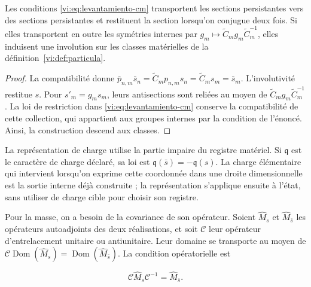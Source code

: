 \begin{proposition}
\label{vi:prop:antiseccion-persistente}
Les conditions \eqref{vi:eq:levantamiento-cm} transportent les sections
persistantes vers des sections persistantes et restituent la section lorsqu’on
conjugue deux fois. Si elles transportent en outre les symétries internes par
$g_m\mapsto\widetilde C_mg_m\widetilde C_m^{-1}$, elles induisent une
involution sur les classes matérielles de la
définition~\ref{vi:def:particula}.

\end{proposition}
\begin{proof}
La compatibilité donne
$\bar p_{n,m}\bar s_n=\widetilde C_mp_{n,m}s_n
=\widetilde C_ms_m=\bar s_m$.
L’involutivité restitue $s$. Pour $s'_m=g_ms_m$, leurs
antisections sont reliées au moyen de
$\widetilde C_mg_m\widetilde C_m^{-1}$. La loi de restriction
dans \eqref{vi:eq:levantamiento-cm} conserve la compatibilité de cette
collection, qui appartient aux groupes internes par la condition de
l’énoncé. Ainsi, la construction descend aux classes.

\end{proof}

La représentation de charge utilise la partie impaire du registre
matériel. Si $\mathfrak q$ est le caractère de charge déclaré, sa
loi est $\mathfrak q(\bar s)=-\mathfrak q(s)$. La charge élémentaire
qui intervient lorsqu’on exprime cette coordonnée dans une droite dimensionnelle est
la sortie interne déjà construite ; la représentation s’applique ensuite
à l’état, sans utiliser de charge cible pour choisir son registre.


Pour la masse, on a besoin de la covariance de son opérateur. Soient
$\widehat M_s$ et $\widehat M_{\bar s}$ les opérateurs autoadjoints
des deux réalisations, et soit $\mathcal C$ leur opérateur d’entrelacement
unitaire ou antiunitaire. Leur domaine se transporte au moyen de
$\mathcal C\operatorname{Dom}(\widehat M_s)
=\operatorname{Dom}(\widehat M_{\bar s})$. La condition opératorielle est

\begin{equation}
 \mathcal C\widehat M_s\mathcal C^{-1}
 =\widehat M_{\bar s}.
 \label{vi:eq:covariancia-masa}
\end{equation}

